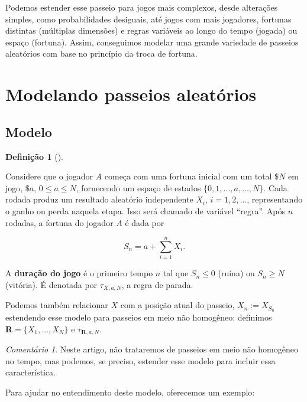 \documentclass[
  brazilian,
  12pt,
]{article}
\theoremstyle{definition}
\theoremstyle{definition}
\newtheorem{definition}{Definição}[section]
\theoremstyle{remark}
\newtheorem{refremark}{Comentário}[section]
\begin{document}
Podemos estender esse passeio para jogos mais complexos, desde
alterações simples, como probabilidades desiguais, até jogos com mais
jogadores, fortunas distintas (múltiplas dimensões) e regras variáveis
ao longo do tempo (jogada) ou espaço (fortuna). Assim, conseguimos
modelar uma grande variedade de passeios aleatórios com base no
princípio da troca de fortuna.

\section{Modelando passeios
aleatórios}\label{modelando-passeios-aleatuxf3rios}

\subsection{Modelo}\label{modelo}

\begin{definition}[]\protect\hypertarget{def-modelodiscreto}{}\label{def-modelodiscreto}

Considere que o jogador \(A\) começa com uma fortuna inicial com um
total \(\$N\) em jogo, \(\$a\), \(0 \leq a \leq N\), fornecendo um
espaço de estados \(\{0, 1, \dots, a, \dots, N\}\). Cada rodada produz
um resultado aleatório independente \(X_i\), \(i=1,2,\dots\),
representando o ganho ou perda naquela etapa. Isso será chamado de
variável ``regra''. Após \(n\) rodadas, a fortuna do jogador \(A\) é
dada por

\[
S_n = a + \sum_{i=1}^n X_i.
\]

A \textbf{duração do jogo} é o primeiro tempo \(n\) tal que
\(S_n \leq 0\) (ruína) ou \(S_n \geq N\) (vitória). É denotada por
\(\tau_{X, a, N}\), a regra de parada.

Podemos também relacionar \(X\) com a posição atual do passeio,
\(X_{n} := X_{S_n}\) estendendo esse modelo para passeios em meio não
homogêneo: definimos \(\pmb{R} =
\{X_1, \dots, X_N\}\) e \(\tau_{\pmb{R}, a, N}\).

\end{definition}

\begin{refremark}
Neste artigo, não trataremos de passeios em meio não homogêneo no tempo,
mas podemos, se preciso, estender esse modelo para incluir essa
característica.

\label{rem-tempo}

\end{refremark}

Para ajudar no entendimento deste modelo, oferecemos um exemplo:
\end{document}
